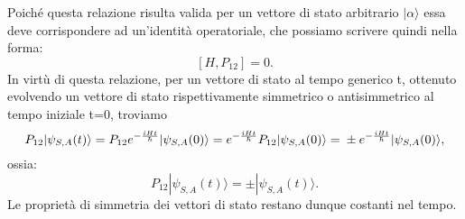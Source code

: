 Poiché questa relazione risulta valida per un vettore di stato arbitrario $|\alpha\rangle$ essa deve corrispondere ad un'identità operatoriale, che possiamo scrivere quindi nella forma:
\begin{equation}
\left [ H, P_{12}\right ]=0 .
\end{equation}
In virtù di questa relazione, per un vettore di stato al tempo generico t, ottenuto evolvendo un vettore di stato rispettivamente simmetrico o antisimmetrico al tempo iniziale t=0, troviamo
\begin{equation}
P_{12}|\psi_{S,A}(t)\rangle= P_{12}e^{-\frac{iHt}{\hbar}}|\psi_{S,A}(0)\rangle=e^{
{-\frac{iHt}{\hbar}}
}P_{12}|\psi_{S,A}(0)\rangle=\\\pm e^{-\frac{iHt}{\hbar}}|\psi_{S,A}(0)\rangle ,
\end{equation}
ossia:
\begin{equation}
P_{12}|\psi_{S,A}(t)\rangle= \pm |\psi_{S,A}(t)\rangle .
\end{equation}
Le proprietà di simmetria dei vettori di stato restano dunque costanti nel tempo.
